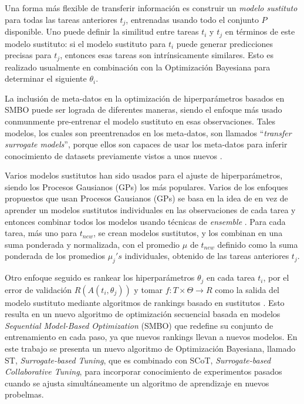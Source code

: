\quad

Una forma más flexible de transferir información es construir un \textit{modelo sustituto} para todas las tareas anteriores $t_j$, entrenadas usando todo el conjunto $P$ disponible. Uno puede definir la similitud entre tareas $t_i$ y $t_j$ en términos de este modelo sustituto: si el modelo sustituto para $t_i$ puede generar predicciones precisas para $t_{j}$, entonces esas tareas son intrínsicamente similares. Esto es realizado usualmente en combinación con la Optimización Bayesiana para determinar el siguiente $\theta_i$. 

La inclusión de meta-datos en la optimización de hiperparámetros basados en SMBO puede ser lograda de diferentes maneras, siendo el enfoque más usado conmunmente pre-entrenar el modelo sustituto en esas observaciones. Tales modelos, los cuales son preentrenados en los meta-datos, son llamados ``\textit{transfer surrogate models}'', porque ellos son capaces de usar los meta-datos para inferir conocimiento de datasets previamente vistos a unos nuevos \cite{witsuba2018scalable}.

Varios modelos sustitutos han sido usados para el ajuste de hiperparámetros, siendo los Procesos Gausianos (GPs) los más populares. Varios de los enfoques propuestos que usan Procesos Gausianos (GPs) se basa en la idea de en vez de aprender un modelos sustitutos individuales en las observaciones de cada tarea y entonces combinar todos los modelos usando técnicas de \textit{ensemble} \cite{witsuba2015learning, witsuba2018scalable}. Para cada tarea, más uno para $t_{new}$, se crean modelos sustitutos, y los combinan en una suma ponderada y normalizada, con el promedio $\mu$ de $t_{new}$ definido como la suma ponderada de los promedios $\mu_j's$ individuales, obtenido de las tareas anteriores $t_j$. 

Otro enfoque seguido es rankear los hiperparámetros $\theta_j$ en cada tarea $t_i$, por el error de validación $R(A(t_i, \theta_j))$ y tomar  $f: T \times \Theta \rightarrow R$ como la salida del modelo sustituto mediante algoritmos de rankings basado en sustitutos \cite{bardenet2013hyper, yogatama2014efficient}. Esto resulta en un nuevo algoritmo de optimización secuencial basada en modelos \textit{Sequential Model-Based Optimization} (SMBO) que redefine su conjunto de entrenamiento en cada paso, ya que nuevos rankings llevan a nuevos modelos. En este trabajo se presenta un nuevo algoritmo de Optimización Bayesiana, llamado ST, \textit{Surrogate-based Tuning}, que es combinado con SCoT, \textit{Surrogate-based Collaborative Tuning}, para incorporar conocimiento de experimentos pasados cuando se ajusta simultáneamente un algoritmo de aprendizaje en nuevos probelmas.

